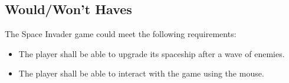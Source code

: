 \subsection{Would/Won't Haves}
The Space Invader game could meet the following requirements:
\begin{itemize}
	\item The player shall be able to upgrade its spaceship after a wave of enemies.
	\item The player shall be able to interact with the game using the mouse.
\end{itemize}